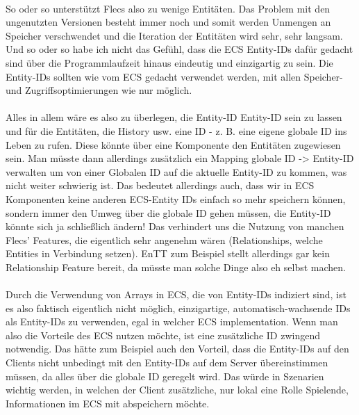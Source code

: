 \documentclass[11pt]{article}
\begin{document}
    \paragraph{}
    So oder so unterstützt Flecs also zu wenige Entitäten.
    Das Problem mit den ungenutzten Versionen besteht immer noch und somit werden Unmengen an Speicher verschwendet und
    die Iteration der Entitäten wird sehr, sehr langsam.
    Und so oder so habe ich nicht das Gefühl, dass die ECS Entity-IDs dafür gedacht sind über die Programmlaufzeit hinaus
    eindeutig und einzigartig zu sein.
    Die Entity-IDs sollten wie vom ECS gedacht verwendet werden, mit allen Speicher- und Zugriffsoptimierungen wie nur möglich.

    \paragraph{}
    Alles in allem wäre es also zu überlegen, die Entity-ID Entity-ID sein zu lassen und für die Entitäten, die History usw.
    eine ID - z. B. eine eigene globale ID ins Leben zu rufen.
    Diese könnte über eine Komponente den Entitäten zugewiesen sein.
    Man müsste dann allerdings zusätzlich ein Mapping globale ID -> Entity-ID verwalten um von einer Globalen ID auf
    die aktuelle Entity-ID zu kommen, was nicht weiter schwierig ist.
    Das bedeutet allerdings auch, dass wir in ECS Komponenten keine anderen ECS-Entity IDs einfach so mehr speichern können,
    sondern immer den Umweg über die globale ID gehen müssen, die Entity-ID könnte sich ja schließlich ändern!
    Das verhindert uns die Nutzung von manchen Flecs' Features, die eigentlich sehr angenehm wären (Relationships, welche Entities in Verbindung setzen).
    EnTT zum Beispiel stellt allerdings gar kein Relationship Feature bereit, da müsste man solche Dinge also eh selbst machen.

    \paragraph{}
    Durch die Verwendung von Arrays in ECS, die von Entity-IDs indiziert sind, ist es also faktisch eigentlich nicht möglich,
    einzigartige, automatisch-wachsende IDs als Entity-IDs zu verwenden, egal in welcher ECS implementation.
    Wenn man also die Vorteile des ECS nutzen möchte, ist eine zusätzliche ID zwingend notwendig.
    Das hätte zum Beispiel auch den Vorteil, dass die Entity-IDs auf den Clients nicht unbedingt mit den Entity-IDs auf dem Server übereinstimmen
    müssen, da alles über die globale ID geregelt wird.
    Das würde in Szenarien wichtig werden, in welchen der Client zusätzliche, nur lokal eine Rolle Spielende, Informationen im ECS
    mit abspeichern möchte.
\end{document}

